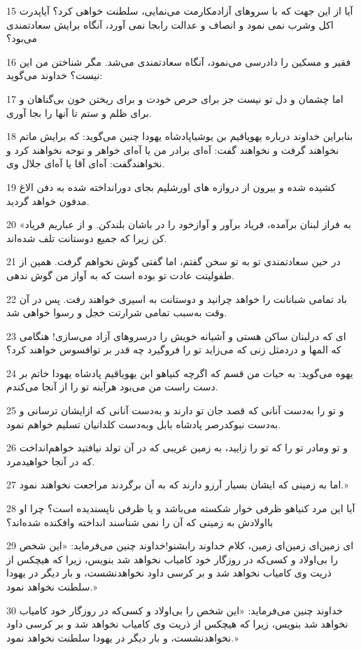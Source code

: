 \par 15 آیا از این جهت که با سروهای آزادمکارمت می‌نمایی، سلطنت خواهی کرد؟ آیاپدرت اکل وشرب نمی نمود و انصاف و عدالت رابجا نمی آورد، آنگاه برایش سعادتمندی می‌بود؟
\par 16 فقیر و مسکین را دادرسی می‌نمود، آنگاه سعادتمندی می‌شد. مگر شناختن من این نیست؟ خداوند می‌گوید:
\par 17 اما چشمان و دل تو نیست جز برای حرص خودت و برای ریختن خون بی‌گناهان و برای ظلم و ستم تا آنها را بجا آوری.
\par 18 بنابراین خداوند درباره یهویاقیم بن یوشیاپادشاه یهودا چنین می‌گوید: که برایش ماتم نخواهند گرفت و نخواهند گفت: آه‌ای برادر من یا آه‌ای خواهر و نوحه نخواهند کرد و نخواهندگفت: آه‌ای آقا یا آه‌ای جلال وی.
\par 19 کشیده شده و بیرون از دروازه های اورشلیم بجای دورانداخته شده به دفن الاغ مدفون خواهد گردید.
\par 20 «به فراز لبنان برآمده، فریاد برآور و آوازخود را در باشان بلندکن. و از عباریم فریاد کن زیرا که جمیع دوستانت تلف شده‌اند.
\par 21 در حین سعادتمندی تو به تو سخن گفتم، اما گفتی گوش نخواهم گرفت. همین از طفولیتت عادت تو بوده است که به آواز من گوش ندهی.
\par 22 باد تمامی شبانانت را خواهد چرانید و دوستانت به اسیری خواهند رفت. پس در آن وقت به‌سبب تمامی شرارتت خجل و رسوا خواهی شد.
\par 23 ‌ای که درلبنان ساکن هستی و آشیانه خویش را درسروهای آزاد می‌سازی! هنگامی که المها و دردمثل زنی که می‌زاید تو را فرو‌گیرد چه قدر بر توافسوس خواهند کرد؟
\par 24 یهوه می‌گوید: به حیات من قسم که اگر‌چه کنیاهو ابن یهویاقیم پادشاه یهودا خاتم بر دست راست من می‌بود هرآینه تو را از آنجا می‌کندم.
\par 25 و تو را به‌دست آنانی که قصد جان تو دارند و به‌دست آنانی که ازایشان ترسانی و به‌دست نبوکدرصر پادشاه بابل وبه‌دست کلدانیان تسلیم خواهم نمود.
\par 26 و تو ومادر تو را که تو را زایید، به زمین غریبی که در آن تولد نیافتید خواهم‌انداخت که در آنجا خواهیدمرد.
\par 27 اما به زمینی که ایشان بسیار آرزو دارند که به آن برگردند مراجعت نخواهند نمود.»
\par 28 آیا این مرد کنیاهو ظرفی خوار شکسته می‌باشد و یا ظرفی ناپسندیده است؟ چرا او بااولادش به زمینی که آن را نمی شناسند انداخته وافکنده شده‌اند؟
\par 29 ‌ای زمین‌ای زمین‌ای زمین، کلام خداوند رابشنو!خداوند چنین می‌فرماید: «این شخص را بی‌اولاد و کسی‌که در روزگار خود کامیاب نخواهد شد بنویس، زیرا که هیچکس از ذریت وی کامیاب نخواهد شد و بر کرسی داود نخواهدنشست، و بار دیگر در یهودا سلطنت نخواهد نمود.»
\par 30 خداوند چنین می‌فرماید: «این شخص را بی‌اولاد و کسی‌که در روزگار خود کامیاب نخواهد شد بنویس، زیرا که هیچکس از ذریت وی کامیاب نخواهد شد و بر کرسی داود نخواهدنشست، و بار دیگر در یهودا سلطنت نخواهد نمود.»
 
